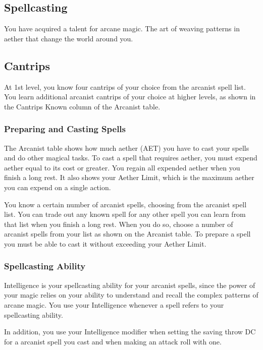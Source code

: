 \subsection{Spellcasting}

You have acquired a talent for arcane magic. The art of weaving patterns in aether that change the world around you.

\subsection{Cantrips}

At 1st level, you know four cantrips of your choice from the arcanist spell list. You learn additional arcanist cantrips of your choice at higher levels, as shown in the Cantrips Known column of the Arcanist table.

\subsubsection{Preparing and Casting Spells}

The Arcanist table shows how much aether (AET) you have to cast your spells and do other magical tasks. To cast a spell that requires aether, you must expend aether equal to its cost or greater. You regain all expended aether when you finish a long rest. It also shows your Aether Limit, which is the maximum aether you can expend on a single action.

You know a certain number of arcanist spells, choosing from the arcanist spell list. You can trade out any known spell for any other spell you can learn from that list when you finish a long rest. When you do so, choose a number of arcanist spells from your list as shown on the Arcanist table. To prepare a spell you must be able to cast it without exceeding your Aether Limit.

\subsubsection{Spellcasting Ability}

Intelligence is your spellcasting ability for your arcanist spells, since the power of your magic relies on your ability to understand and recall the complex patterns of arcane magic. You use your Intelligence whenever a spell refers to your spellcasting ability. 

In addition, you use your Intelligence modifier when setting the saving throw DC for a arcanist spell you cast and when making an attack roll with one.

